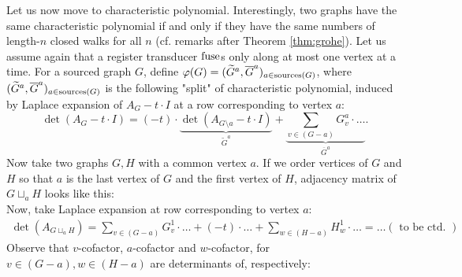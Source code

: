 Let us now move to characteristic polynomial. Interestingly, two graphs have the same characteristic polynomial if and only if they have the same numbers of length-$n$ closed walks for all $n$ (cf. remarks after Theorem \ref{thm:grohe}). Let us assume again that a register transducer $\operatorname{fuse}$s only along at most one vertex at a time. For a sourced graph $G$, define $\varphi(G) = ({\widetilde{G}}^a, \overline{G}^a)_{a \in \operatorname{sources}(G)}$, where $({\widetilde{G}}^a, \overline{G}^a)_{a \in \operatorname{sources}(G)}$ is the following "split" of characteristic polynomial, induced by Laplace expansion of $A_G-t\cdot I$ at a row corresponding to vertex $a$:
$$
	\det(A_G-t\cdot I) = (-t)\cdot \underbrace{\det(A_{G\setminus a} - t\cdot I)}_{{\widetilde{G}}^a} + \underbrace{\sum_{v \in (G-a)}G^a_v \cdot \ldots}_{\overline{G}^a}.
$$
Now take two graphs $G, H$ with a common vertex $a$. If we order vertices of $G$ and $H$ so that $a$ is the last vertex of $G$ and the first vertex of $H$, adjacency matrix of $G\sqcup_aH$ looks like this:\\

Now, take Laplace expansion at row corresponding to vertex $a$:
\begin{multline*}
	\det(A_{G\sqcup_a H}) = \sum_{v \in (G- a)} G^1_v \cdot \ldots + (-t) \cdot \ldots + \sum_{w \in (H- a)} H^1_w \cdot \ldots = \ldots (\text{ to be ctd. })
\end{multline*}
Observe that $v$-cofactor, $a$-cofactor and $w$-cofactor, for $v\in (G-a), w \in (H-a)$ are determinants of, respectively:\\
